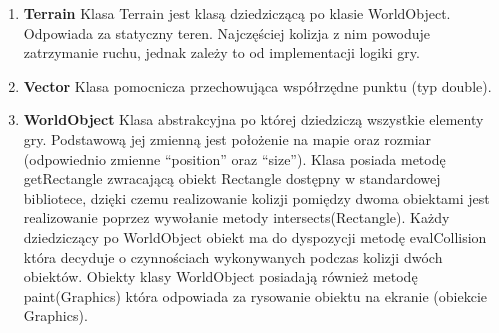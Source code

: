 \begin{par}
\begin{enumerate}
	\item{\bf Terrain }\newline
	Klasa Terrain jest klasą dziedziczącą po klasie WorldObject. Odpowiada za statyczny teren. Najczęściej kolizja z nim powoduje zatrzymanie ruchu, jednak zależy to od implementacji logiki gry.
	\item{\bf Vector }\newline
	Klasa pomocnicza przechowująca współrzędne punktu (typ double).
	\item{\bf WorldObject }\newline
	Klasa abstrakcyjna po której dziedziczą wszystkie elementy gry. Podstawową jej zmienną jest położenie na mapie oraz rozmiar (odpowiednio zmienne ``position'' oraz ``size'').
	Klasa posiada metodę getRectangle zwracającą obiekt Rectangle dostępny w standardowej bibliotece, dzięki czemu realizowanie kolizji pomiędzy dwoma obiektami jest realizowanie poprzez wywołanie metody intersects(Rectangle). Każdy dziedziczący po WorldObject obiekt ma do dyspozycji metodę evalCollision która decyduje o czynnościach wykonywanych podczas kolizji dwóch obiektów. Obiekty klasy WorldObject posiadają również metodę paint(Graphics) która odpowiada za rysowanie obiektu na ekranie (obiekcie Graphics).
	\end{enumerate}

\end{par}


